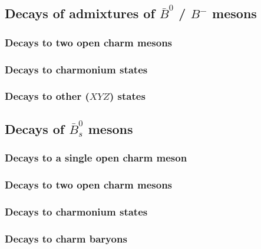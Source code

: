 \subsection{Decays of admixtures of $\bar{B}^0$ / $B^-$ mesons}

\subsubsection{Decays to two open charm mesons}

\subsubsection{Decays to charmonium states}

\subsubsection{Decays to other ($XYZ$) states}


\subsection{Decays of $\bar{B}_s^0$ mesons}

\subsubsection{Decays to a single open charm meson}

\subsubsection{Decays to two open charm mesons}

\subsubsection{Decays to charmonium states}

\subsubsection{Decays to charm baryons}


